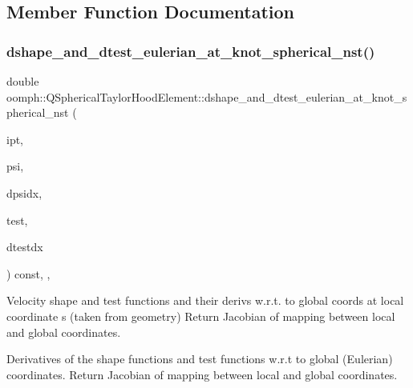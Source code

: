 \subsection{Member Function Documentation}
\mbox{\label{classoomph_1_1QSphericalTaylorHoodElement_accf74eeba4a63dff1ca12048b751fed2}} 
\subsubsection{\texorpdfstring{dshape\+\_\+and\+\_\+dtest\+\_\+eulerian\+\_\+at\+\_\+knot\+\_\+spherical\+\_\+nst()}{dshape\_and\_dtest\_eulerian\_at\_knot\_spherical\_nst()}}
{\footnotesize\ttfamily double oomph\+::\+Q\+Spherical\+Taylor\+Hood\+Element\+::dshape\+\_\+and\+\_\+dtest\+\_\+eulerian\+\_\+at\+\_\+knot\+\_\+spherical\+\_\+nst (\begin{DoxyParamCaption}\item[{const unsigned \&}]{ipt,  }\item[{\hyperlink{classoomph_1_1Shape}{Shape} \&}]{psi,  }\item[{\hyperlink{classoomph_1_1DShape}{D\+Shape} \&}]{dpsidx,  }\item[{\hyperlink{classoomph_1_1Shape}{Shape} \&}]{test,  }\item[{\hyperlink{classoomph_1_1DShape}{D\+Shape} \&}]{dtestdx }\end{DoxyParamCaption}) const\hspace{0.3cm}{\ttfamily [inline]}, {\ttfamily [protected]}, {\ttfamily [virtual]}}



Velocity shape and test functions and their derivs w.\+r.\+t. to global coords at local coordinate s (taken from geometry) Return Jacobian of mapping between local and global coordinates. 

Derivatives of the shape functions and test functions w.\+r.\+t to global (Eulerian) coordinates. Return Jacobian of mapping between local and global coordinates. 

